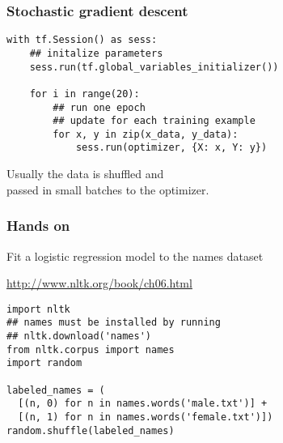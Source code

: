 \documentclass{beamer}
\begin{document}
\begin{frame}[fragile]
  \frametitle{Stochastic gradient descent}

\begin{lstlisting}
with tf.Session() as sess:
    ## initalize parameters
    sess.run(tf.global_variables_initializer())

    for i in range(20):
        ## run one epoch
        ## update for each training example
        for x, y in zip(x_data, y_data):
            sess.run(optimizer, {X: x, Y: y})
\end{lstlisting}

\pause
Usually the data is shuffled and\\ passed in small batches to the optimizer.

\end{frame}


\begin{frame}[fragile]
\frametitle{Hands on}

Fit a logistic regression model to the names dataset

\url{http://www.nltk.org/book/ch06.html}
\begin{lstlisting}
import nltk
## names must be installed by running
## nltk.download('names')
from nltk.corpus import names
import random

labeled_names = ( 
  [(n, 0) for n in names.words('male.txt')] +
  [(n, 1) for n in names.words('female.txt')])
random.shuffle(labeled_names)

\end{lstlisting}
\end{frame}
\end{document}
